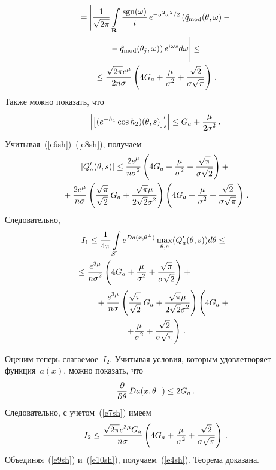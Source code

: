 \begin{multicols}{2}
\begin{multline}
{}=\Bigg \vert \fr{1}{\sqrt{2\pi}}\int\limits_{\mathbf{R}}\fr{\mathrm{sgn}(\omega)}{i}\,e^{-\sigma^2\omega^2/2}
\left (\hat{q}_{\mathrm{mod}}
(\theta,\omega) -{}\right.\\
\left.{}-\hat{q}_{\mathrm{mod}}(\theta_j,\omega)\right )e^{i\omega s}d\omega\Bigg \vert \leq{}\\
{}\leq\fr{\sqrt{2\pi}e^\mu}{2n\sigma}\left(4G_a+\fr{\mu}{\sigma^2}+\fr{\sqrt{2}}{\sigma\sqrt{\pi}}\right)\,.
\label{e7sh}
\end{multline}
Также можно показать, что
\begin{equation}
\left|\left[(e^{-h_1}\cos{h_2})(\theta,s)\right]'_s\right| \leq G_a+\fr{\mu}{2\sigma^2}\,.
\label{e8sh}
\end{equation}
Учитывая~(\ref{e6sh})--(\ref{e8sh}), получаем
\begin{multline*}
\left|Q'_a(\theta,s)\right|\leq\displaystyle\frac{\displaystyle 2e^\mu\mathstrut}{\displaystyle n\sigma^2\mathstrut}\left(4G_a+\displaystyle\frac{\displaystyle \mu\mathstrut}{\displaystyle \sigma^2\mathstrut}+\displaystyle\frac{\displaystyle \sqrt{\pi}\mathstrut}{\displaystyle \sigma\sqrt{2}\mathstrut}\right)+{}\\
{}+\displaystyle\frac{\displaystyle 2e^\mu\mathstrut}{\displaystyle n\sigma\mathstrut}\left(\displaystyle\frac{\displaystyle \sqrt{\pi}\mathstrut}{\displaystyle \sqrt{2}\mathstrut}\,G_a+\displaystyle\frac{\displaystyle \sqrt{\pi}\mu\mathstrut}{\displaystyle 2\sqrt{2}\sigma^2\mathstrut}\right)
\left(4G_a+\displaystyle\frac{\displaystyle \mu\mathstrut}{\displaystyle \sigma^2\mathstrut}+\displaystyle\frac{\displaystyle \sqrt{2}\mathstrut}{\displaystyle \sigma\sqrt{\pi}\mathstrut}\right)\,.
\end{multline*}
Следовательно,
\begin{multline*}
\!\!I_1\leq\fr{1}{4\pi}\int\limits_{S^1}e^{Da(x,\theta^{\perp})}\max\limits_{\theta,s}(Q'_a(\theta,s))d\theta\leq{}\\
\!\!\!\!\!\!\!\!\!\!\!\!\!\!{}\leq\fr{e^{3\mu}}{n\sigma^2}\left(
4G_a+\fr{\mu}{\sigma^2}+\fr{\sqrt{\pi}}{\sigma\sqrt{2}}\right)+{}\hspace*{10mm}
\end{multline*}
\begin{multline}
\ \ \ \ \ \ {}+\fr{e^{3\mu}}{n\sigma}\left(\fr{\sqrt{\pi}}{\sqrt{2}}\,G_a+\fr{\sqrt{\pi}\mu}{2\sqrt{2}\sigma^2}\right)
\left(
\vphantom{\fr{\sqrt{2}}{\sigma\sqrt{\pi}}}
4G_a+{}\right.\\
{}\left.+\fr{\mu}{\sigma^2}+\fr{\sqrt{2}}{\sigma\sqrt{\pi}}\right)\,.
\label{e9sh}
\end{multline}

Оценим теперь слагаемое~$I_2$. Учитывая условия, которым удовлетворяет функция~$a(x)$, можно показать, что
$$
\displaystyle\frac{\displaystyle \partial\mathstrut}{\displaystyle \partial\theta\mathstrut}\,Da(x,\theta^{\perp})\leq 2G_a\,.
$$
Следовательно, с учетом~(\ref{e7sh}) имеем
\begin{equation}
I_2\leq\fr{\sqrt{2\pi}e^{3\mu}G_a}{n\sigma}\left(4G_a+\fr{\mu}{\sigma^2}+\fr{\sqrt{2}}{\sigma\sqrt{\pi}}\right)\,.
\label{e10sh}
\end{equation}
Объединяя~(\ref{e9sh}) и~(\ref{e10sh}), получаем~(\ref{e4sh}). Теорема доказана.


\end{multicols}
